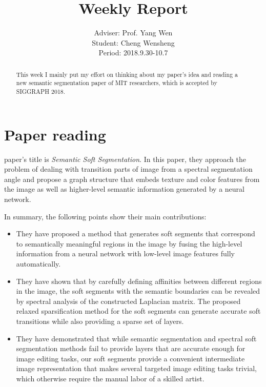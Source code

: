 \documentclass[]{IEEEtran}
\begin{document}
	\title{Weekly Report}
	\author{Adviser: Prof. Yang Wen \\Student: Cheng Wensheng\\ Period: 2018.9.30-10.7
	}
	\maketitle

\begin{abstract}
	This week I mainly put my effort on thinking about my paper's idea and reading a new semantic segmentation paper of MIT researchers, which is accepted by SIGGRAPH 2018.
\end{abstract}

\section{Paper reading}
	 paper's title is \emph{Semantic Soft Segmentation}. In this paper, they approach the problem of dealing with transition parts of image from a spectral segmentation angle and propose a graph structure that embeds texture and color features from the image as well as higher-level semantic information generated by a neural network.

	In summary, the following points show their main contributions:
	\begin{itemize}
		\item They have proposed a method that generates soft segments that correspond to semantically meaningful regions in the image by fusing the high-level information from a neural network with low-level
		image features fully automatically.
		\item They have shown that by carefully
		defining affinities between different regions in the image, the soft segments with the semantic boundaries can be revealed by spectral analysis of the constructed Laplacian matrix. The proposed relaxed sparsification method for the soft segments can generate accurate soft transitions while also providing a sparse set of layers.
		\item They have demonstrated that while semantic segmentation and spectral soft segmentation methods fail to provide layers that are accurate enough for image editing tasks, our soft segments provide
		a convenient intermediate image representation that makes several targeted image editing tasks trivial, which otherwise require the manual labor of a skilled artist.
	\end{itemize}
	
\end{document}
